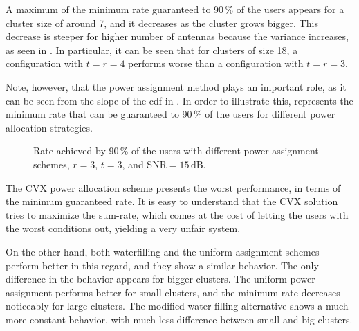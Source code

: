 A maximum of the minimum rate guaranteed to 90\,\% of the users appears for a
cluster size of around 7, and it decreases as the cluster grows bigger. This
decrease is steeper for higher number of antennas because the variance
increases, as seen in . In particular, it can be seen
that for clusters of size 18, a configuration with $t=r=4$ performs worse than a
configuration with $t=r=3$.

Note, however, that the power assignment method plays an important role, as it
can be seen from the slope of the \gls{cdf} in . In
order to illustrate this,  represents the minimum
rate that can be guaranteed to 90\,\% of the users for different power
allocation strategies.

\begin{figure}[t]
\begin{center}
    
    \restoregeometry
\end{center}
\caption{Rate achieved by 90\,\% of the users with different power assignment
schemes, $r=3$, $t=3$, and SNR$=15$\,dB.}
\label{fig:min_rate_power_alloc}
\end{figure}

The CVX power allocation scheme presents the worst performance, in terms of
the minimum guaranteed rate. It is easy to understand that the CVX solution
tries to maximize the sum-rate, which comes at the cost of letting the users
with the worst conditions out, yielding a very unfair system.

On the other hand, both waterfilling and the uniform assignment schemes perform
better in this regard, and they show a similar behavior. The only difference in
the behavior appears for bigger clusters. The uniform power assignment performs
better for small clusters, and the minimum rate decreases noticeably for large
clusters. The modified water-filling alternative shows a much more constant
behavior, with much less difference between small and big clusters.

